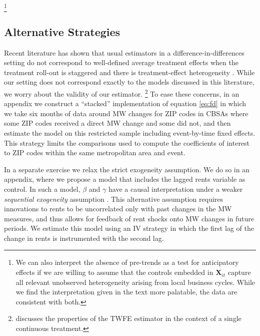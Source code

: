 \footnote{We can also interpret the absence of pre-trends as a test for 
anticipatory effects if we are willing to assume that the controls embedded in 
$\mathbf{X}_{it}$ capture all relevant unobserved heterogeneity arising from 
local business cycles.
While we find the interpretation given in the text more palatable, the data are 
consistent with both.}


\subsection{Alternative Strategies}\label{sec:alt_emp_strategies}

Recent literature has shown that usual estimators in a difference-in-differences 
setting do not correspond to well-defined average treatment effects when the 
treatment roll-out is staggered and there is treatment-effect heterogeneity 
\parencite{deChaisemartinEtAl2022,RothEtAl2022}.
While our setting does not correspond exactly to the models discussed in this
literature, we worry about the validity of our estimator.%
\footnote{\textcite[][Section 3.4]{CallawayEtAl2021} discusses the properties 
of the TWFE estimator in the context of a single continuous treatment.}
To ease these concerns, in an appendix we construct a ``stacked'' implementation 
of equation \eqref{eq:fd} in which we take six months of data around MW changes 
for ZIP codes in CBSAs where some ZIP codes received a direct MW change and 
some did not, 
and then estimate the model on this restricted sample including event-by-time 
fixed effects.
This strategy limits the comparisons used to compute the coefficients of 
interest to ZIP codes within the same metropolitan area and event.

In a separate exercise we relax the strict exogeneity assumption.
We do so in an appendix, where we propose a model that includes the lagged 
rents variable as control.
In such a model, $\beta$ and $\gamma$ have a causal interpretation under a 
weaker \textit{sequential exogeneity} assumption
\parencite{ArellanoBond1991, ArellanoHonore2001}.
This alternative assumption requires innovations to rents to be uncorrelated 
only with past changes in the MW measures, and thus allows for feedback of 
rent shocks onto MW changes in future periods.
We estimate this model using an IV strategy in which the first lag of the change
in rents is instrumented with the second lag.


